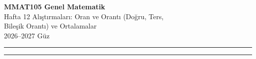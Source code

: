 \documentclass[11pt,a4paper]{article}
\newcounter{alis}
\begin{document}
\begin{minipage}[c]{\textwidth}
{\LARGE\bfseries\color{anamavi} MMAT105 Genel Matematik}\\[4pt]
{\large Hafta 12 Alıştırmaları: Oran ve Orantı (Doğru, Ters,\\ Bileşik Orantı) ve Ortalamalar}\\[6pt]
{\small 2026--2027 Güz}
\end{minipage}

\vspace{4pt}\noindent\textcolor{anamavi}{\rule{\textwidth}{1pt}}



\vspace{6pt}
\noindent\textcolor{anamavi}{\rule{\textwidth}{0.5pt}}\\
{\small }
\end{document}
